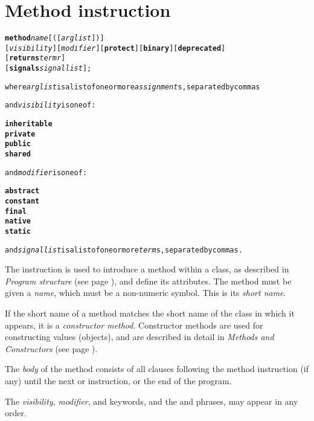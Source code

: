 \chapter{Method instruction}\label{refmethod}
\index{,}
\index{,}
\begin{shaded}
\begin{alltt}
\textbf{method} \emph{name}[([\emph{arglist}])]
               [\emph{visibility}] [\emph{modifier}] [\textbf{protect}] [\textbf{binary}] [\textbf{deprecated}]
               [\textbf{returns} \emph{termr}]
               [\textbf{signals} \emph{signallist}];

where \emph{arglist} is a list of one or more \emph{assignment}s, separated by commas

and \emph{visibility} is one of:

    \textbf{inheritable}
    \textbf{private}
    \textbf{public}
    \textbf{shared}

and \emph{modifier} is one of:

    \textbf{abstract}
    \textbf{constant}
    \textbf{final}
    \textbf{native}
    \textbf{static}

and \emph{signallist} is a list of one or more \emph{term}s, separated by commas.
\end{alltt}
\end{shaded}
 The  instruction is used to introduce a method within
a class, as described in  \emph{Program structure} (see page \pageref{refpstruct}), and define its attributes.
The method must be given a \emph{name}, which must be a non-numeric
symbol.
This is its \emph{short name}.
 
If the short name of a method matches the short name of the class in
which it appears, it is a \emph{constructor method}.
Constructor methods are used for constructing values (objects), and are
described in detail in  \emph{Methods and Constructors} (see page \pageref{refmethcon}).
 
The \emph{body} of the method consists of all clauses following the
method instruction (if any) until the next  or
 instruction, or the end of the program.
 
The \emph{visibility}, \emph{modifier}, and 
keywords, and the  and  phrases, may
appear in any order.
